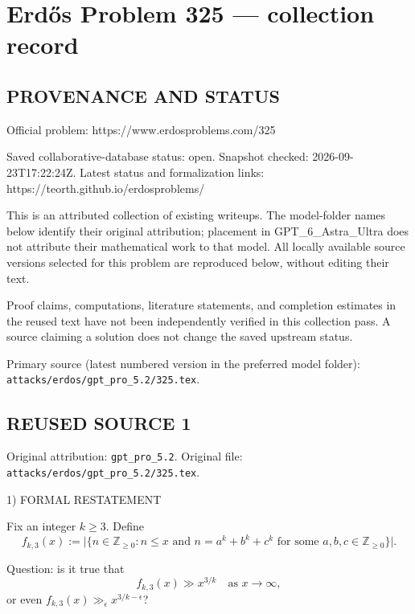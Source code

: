 \section*{Erd\H{o}s Problem 325 --- collection record}

\subsection*{PROVENANCE AND STATUS}
Official problem: https://www.erdosproblems.com/325

Saved collaborative-database status: open.
Snapshot checked: 2026-09-23T17:22:24Z.
Latest status and formalization links: https://teorth.github.io/erdosproblems/

This is an attributed collection of existing writeups. The model-folder names below identify their original attribution; placement in GPT\_6\_Astra\_Ultra does not attribute their mathematical work to that model. All locally available source versions selected for this problem are reproduced below, without editing their text.

Proof claims, computations, literature statements, and completion estimates in the reused text have not been independently verified in this collection pass. A source claiming a solution does not change the saved upstream status.

Primary source (latest numbered version in the preferred model folder): \texttt{attacks/erdos/gpt\_pro\_5.2/325.tex}.

\subsection*{REUSED SOURCE 1}
Original attribution: \texttt{gpt\_pro\_5.2}.
Original file: \texttt{attacks/erdos/gpt\_pro\_5.2/325.tex}.


1) FORMAL RESTATEMENT

Fix an integer $k\ge 3$.
Define
\[
f_{k,3}(x):=\bigl|\{n\in\mathbb Z_{\ge 0}: n\le x\text{ and }n=a^k+b^k+c^k\text{ for some }a,b,c\in\mathbb Z_{\ge 0}\}\bigr|.
\]

Question: is it true that
\[
f_{k,3}(x)\gg x^{3/k}\quad\text{as }x\to\infty,
\]
or even $f_{k,3}(x)\gg_\epsilon x^{3/k-\epsilon}$?

